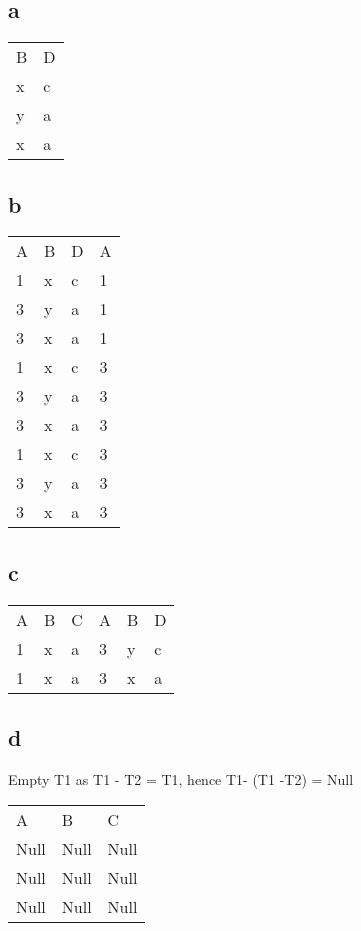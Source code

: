 \documentclass[twoside]{Homework}
\begin{document}
\subsection*{a}
\begin{table}[h]
\begin{tabular}{ll}
B & D \\
x & c \\
y & a \\
x & a
\end{tabular}
\end{table}
\newpage
\subsection*{b}
\begin{table}[h]
    \begin{tabular}{llll}
    A & B & D & A \\
    1 & x & c & 1 \\
    3 & y & a & 1 \\
    3 & x & a & 1 \\
    1 & x & c & 3 \\
    3 & y & a & 3 \\
    3 & x & a & 3 \\
    1 & x & c & 3 \\
    3 & y & a & 3 \\
    3 & x & a & 3 \\
    \end{tabular}
\end{table}

\subsection*{c}
\begin{table}[h]
    \begin{tabular}{llllll}
    A & B & C & A & B & D \\
    1 & x & a & 3 & y & c \\
    1 & x & a & 3 & x & a \\
    \end{tabular}
\end{table}

\subsection*{d}
Empty T1 as T1 - T2 = T1, hence T1- (T1 -T2) = Null 
\begin{table}[h]
\begin{tabular}{lll}
A & B & C\\
Null & Null & Null\\
Null & Null & Null\\
Null & Null & Null
\end{tabular}
\end{table}
\end{document}
